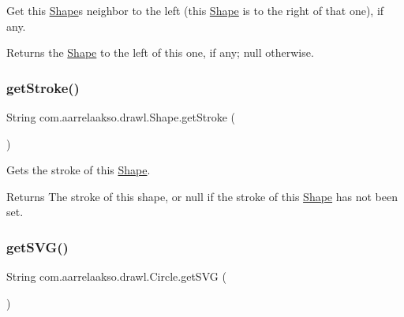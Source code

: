 Get this \hyperlink{classcom_1_1aarrelaakso_1_1drawl_1_1_shape}{Shape}\textquotesingle{}s neighbor to the left (this \hyperlink{classcom_1_1aarrelaakso_1_1drawl_1_1_shape}{Shape} is to the right of that one), if any.

\begin{DoxyReturn}{Returns}
the \hyperlink{classcom_1_1aarrelaakso_1_1drawl_1_1_shape}{Shape} to the left of this one, if any; {\ttfamily null} otherwise. 
\end{DoxyReturn}
\mbox{\label{classcom_1_1aarrelaakso_1_1drawl_1_1_shape_a4e1d54c7e161e3af5053939ddefdf9e6}} 
\subsubsection{\texorpdfstring{get\+Stroke()}{getStroke()}}
{\footnotesize\ttfamily String com.\+aarrelaakso.\+drawl.\+Shape.\+get\+Stroke (\begin{DoxyParamCaption}{ }\end{DoxyParamCaption})\hspace{0.3cm}{\ttfamily [inherited]}}

Gets the stroke of this \hyperlink{classcom_1_1aarrelaakso_1_1drawl_1_1_shape}{Shape}.

\begin{DoxyReturn}{Returns}
The stroke of this shape, or null if the stroke of this \hyperlink{classcom_1_1aarrelaakso_1_1drawl_1_1_shape}{Shape} has not been set. 
\end{DoxyReturn}
\mbox{\label{classcom_1_1aarrelaakso_1_1drawl_1_1_circle_adc826cc2d93eb4e78318035c86d00f03}} 
\subsubsection{\texorpdfstring{get\+S\+V\+G()}{getSVG()}}
{\footnotesize\ttfamily String com.\+aarrelaakso.\+drawl.\+Circle.\+get\+S\+VG (\begin{DoxyParamCaption}{ }\end{DoxyParamCaption})}

